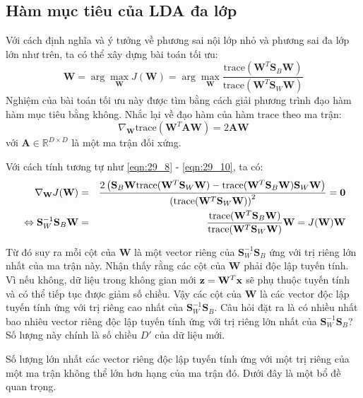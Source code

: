 \subsection{Hàm mục tiêu của LDA đa lớp}
Với cách định nghĩa và ý tưởng về phương sai nội lớp nhỏ và phương sai đa lớp lớn như trên, ta có thể xây dựng bài toán tối ưu:
\begin{equation}
\mathbf{W} = \arg\max_{\mathbf{W}}J(\mathbf{W}) =  \arg\max_{\mathbf{W}} \frac{\text{trace}(\mathbf{W}^T\mathbf{S}_B\mathbf{W})}{\text{trace}(\mathbf{W}^T\mathbf{S}_W\mathbf{W})}
\end{equation}
Nghiệm của bài toán tối ưu này được tìm bằng cách giải phương trình đạo hàm hàm mục tiêu bằng không. Nhắc lại về đạo hàm của hàm $\text{trace}$ theo ma trận:
\begin{equation}
\nabla_{\mathbf{W}} \text{trace}(\mathbf{W}^T\mathbf{A} \mathbf{W}) = 2\mathbf{A}\mathbf{W}
\end{equation}
với $\mathbf{A} \in \mathbb{R}^{D \times D}$ là một ma trận đối xứng.

Với cách tính tương tự như \eqref{eqn:29_8} - \eqref{eqn:29_10}, ta có:
\begin{eqnarray*}
\nabla_{\mathbf{W}} J(\mathbf{W}) &=& \frac{2 \left( \mathbf{S}_B\mathbf{W} \text{trace}(\mathbf{W}^T\mathbf{S}_W\mathbf{W}) - \text{trace}(\mathbf{W}^T\mathbf{S}_B\mathbf{W})\mathbf{S}_W \mathbf{W} \right)}{\left(\text{trace}(\mathbf{W}^T\mathbf{S}_W\mathbf{W})\right)^2}  = \mathbf{0}\\\
\label{eqn:29_24}
\Leftrightarrow \mathbf{S}_W^{-1}\mathbf{S}_B\mathbf{W}&=& \frac{\text{trace}(\mathbf{W}^T\mathbf{S}_B\mathbf{W})}{\text{trace}(\mathbf{W}^T\mathbf{S}_W\mathbf{W})} \mathbf{W} = J(\mathbf{W}) \mathbf{W}
\end{eqnarray*}

Từ đó suy ra mỗi cột của $\mathbf{W}$ là một vector riêng của $\mathbf{S}_W^{-1}
\mathbf{S}_B$ ứng với trị riêng lớn nhất của ma trận này. Nhận thấy rằng các cột
của $\mathbf{W}$ phải độc lập tuyến tính. Vì nếu không, dữ liệu trong không
gian mới $\mathbf{z} = \mathbf{W}^T\mathbf{x}$ sẽ phụ thuộc tuyến tính và có thể tiếp
tục được giảm số chiều. Vậy các cột của $\mathbf{W}$ là các vector độc lập tuyến
tính ứng với trị riêng cao nhất của $\mathbf{S}_W^{-1} \mathbf{S}_B$. Câu hỏi
đặt ra là có nhiều nhất bao nhiêu vector riêng độc lập tuyến tính ứng với trị
riêng lớn nhất của $\mathbf{S}_W^{-1} \mathbf{S}_B$? Số lượng này chính là
số chiều $D'$ của dữ liệu mới.

Số lượng lớn nhất các vector riêng độc lập tuyến tính ứng với một trị riêng của
một ma trận không thể lớn hơn hạng của ma trận đó. Dưới đây là một bổ đề quan
trọng.

